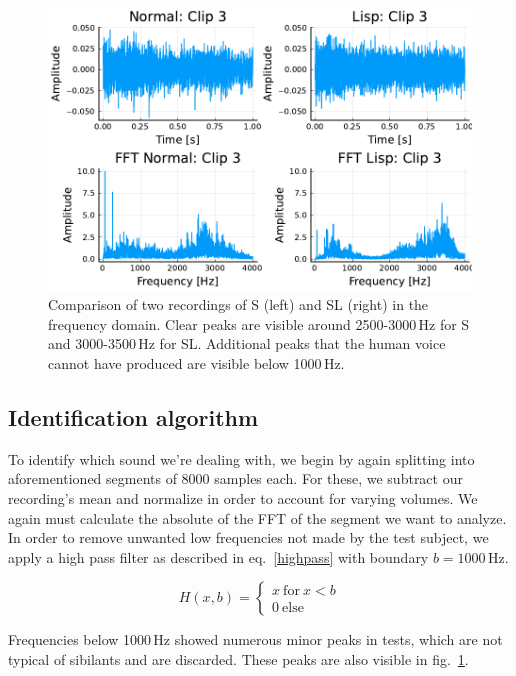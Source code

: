 \documentclass{IEEEtran}
\begin{document}
\begin{figure}[h]
\centering
\includegraphics[trim=0 0 0 145, clip, scale=0.55]{normal_vs_lisp_clip_3.pdf}
\caption{Comparison of two recordings of S (left) and SL (right) in the frequency domain. Clear peaks are visible around 2500-3000\,Hz for S and 3000-3500\,Hz for SL. Additional peaks that the human voice cannot have produced are visible below 1000\,Hz.}\label{examplefft}
\end{figure}

\subsection{Identification algorithm}\label{identify}

To identify which sound we're dealing with,
we begin by again splitting into aforementioned segments of 8000 samples each.
For these, we subtract our recording's mean and normalize in order to account for varying volumes.
We again must calculate the absolute of the FFT of the segment we want to analyze.
In order to remove unwanted low frequencies not made by the test subject,
we apply a high pass filter as described in eq.\ \ref{highpass} with boundary \(b = 1000\)\,Hz.

\begin{equation}
H(x, b) = \begin{cases} x\ \mathrm{for}\ x < b \\ 0\ \mathrm{else} \end{cases}\label{highpass}
\end{equation}

Frequencies below 1000\,Hz showed numerous minor peaks in tests,
which are not typical of sibilants and are discarded.
These peaks are also visible in fig.\ \ref{examplefft}.
\end{document}
